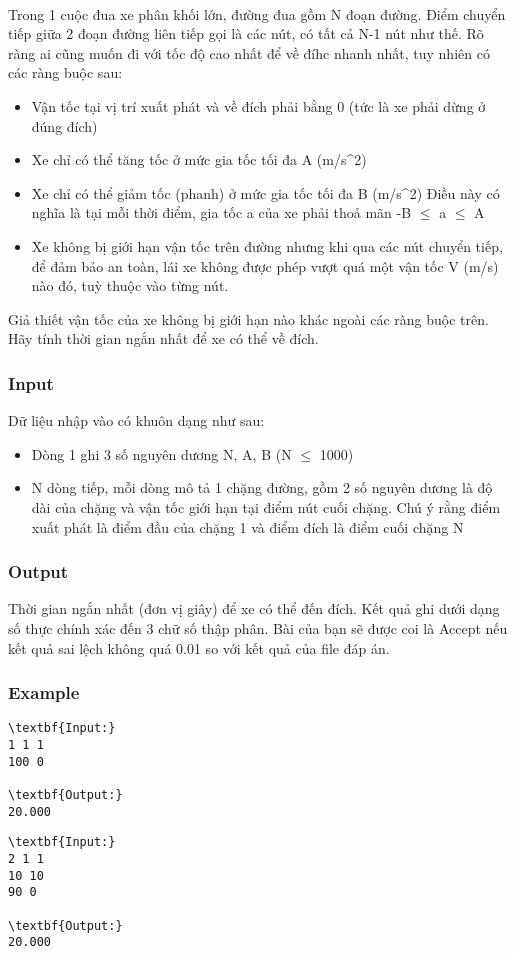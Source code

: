 

 

Trong 1 cuộc đua xe phân khối lớn, đường đua gồm N đoạn đường. Điểm chuyển tiếp giữa 2 đoạn đường liên tiếp gọi là các nút, có tất cả N-1 nút như thế. Rõ ràng ai cũng muốn đi với tốc độ cao nhất để về đíhc nhanh nhất, tuy nhiên có các ràng buộc sau:
\begin{itemize}
	\item Vận tốc tại vị trí xuất phát và về đích phải bằng 0 (tức là xe phải dừng ở đúng đích)
	\item Xe chỉ có thể tăng tốc ở mức gia tốc tối đa A (m/s\textasciicircum2)
	\item Xe chỉ có thể giảm tốc (phanh) ở mức gia tốc tối đa B (m/s\textasciicircum2) Điều này có nghĩa là tại mỗi thời điểm, gia tốc a của xe phải thoả mãn -B $\le$ a $\le$ A
	\item Xe không bị giới hạn vận tốc trên đường nhưng khi qua các nút chuyển tiếp, để đảm bảo an toàn, lái xe không được phép vượt quá một vận tốc V (m/s) nào đó, tuỳ thuộc vào từng nút.
\end{itemize}

Giả thiết vận tốc của xe không bị giới hạn nào khác ngoài các ràng buộc trên. Hãy tính thời gian ngắn nhất để xe có thể về đích.

\subsubsection{Input}

Dữ liệu nhập vào có khuôn dạng như sau:
\begin{itemize}
	\item Dòng 1 ghi 3 số nguyên dương N, A, B (N  $\le$  1000)
	\item N dòng tiếp, mỗi dòng mô tả 1 chặng đường, gồm 2 số nguyên dương là độ dài của chặng và vận tốc giới hạn tại điểm nút cuối chặng. Chú ý rằng điểm xuất phát là điểm đầu của chặng 1 và điểm đích là điểm cuối chặng N
\end{itemize}

\subsubsection{Output}

Thời gian ngắn nhất (đơn vị giây) để xe có thể đến đích. Kết quả ghi dưới dạng số thực chính xác đến 3 chữ số thập phân. Bài của bạn sẽ được coi là Accept nếu kết quả sai lệch không quá 0.01 so với kết quả của file đáp án.

\subsubsection{Example}
\begin{verbatim}
\textbf{Input:}
1 1 1
100 0

\textbf{Output:}
20.000
\end{verbatim}
\begin{verbatim}
\textbf{Input:}
2 1 1
10 10
90 0

\textbf{Output:}
20.000\end{verbatim}
